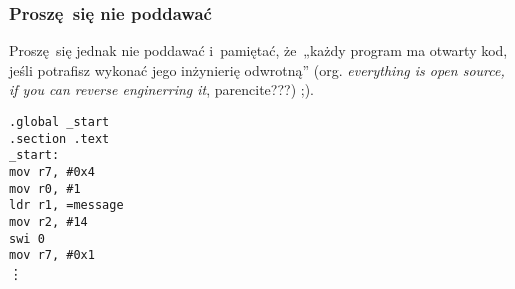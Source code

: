 \documentclass[10pt,t]{beamer}
\begin{document}
\begin{frame}
  \frametitle{Proszę~się nie poddawać}


  Proszę~się jednak nie poddawać i~pamiętać, że~„każdy program ma otwarty
  kod, jeśli potrafisz wykonać jego inżynierię odwrotną” (org.
  \textit{everything is open source, if you can reverse enginerring it},
  parencite{???}) ;).

  \vspace{1.5em}





  \texttt{.global \_start} \\
  \texttt{.section .text} \\



  \texttt{\_start:} \\[-0.2em]
  \hphantom{aaaaaaaa} \texttt{mov r7, \#0x4} \\
  \hphantom{aaaaaaaa} \texttt{mov r0, \#1} \\
  \hphantom{aaaaaaaa} \texttt{ldr r1, =message} \\
  \hphantom{aaaaaaaa} \texttt{mov r2, \#14} \\

  \hphantom{aaaaaaaa} \texttt{swi 0} \\

  \hphantom{aaaaaaaa} \texttt{mov r7, \#0x1} \\
  \hspace{5em} \vdots





\end{frame}





\end{document}
